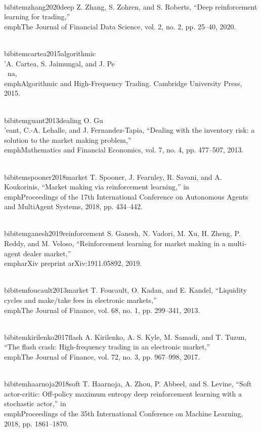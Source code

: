 \documentclass[11pt,a4paper]{article}
\begin{document}
\\bibitem{zhang2020deep}
Z. Zhang, S. Zohren, and S. Roberts, ``Deep reinforcement learning for trading,'' \\emph{The Journal of Financial Data Science}, vol. 2, no. 2, pp. 25--40, 2020.

\\bibitem{cartea2015algorithmic}
{\\'{A}}. Cartea, S. Jaimungal, and J. Pe{\\~{n}}a, \\emph{Algorithmic and High-Frequency Trading}. Cambridge University Press, 2015.

\\bibitem{guant2013dealing}
O. Gu{\\'{e}}ant, C.-A. Lehalle, and J. Fernandez-Tapia, ``Dealing with the inventory risk: a solution to the market making problem,'' \\emph{Mathematics and Financial Economics}, vol. 7, no. 4, pp. 477--507, 2013.

\\bibitem{spooner2018market}
T. Spooner, J. Fearnley, R. Savani, and A. Koukorinis, ``Market making via reinforcement learning,'' in \\emph{Proceedings of the 17th International Conference on Autonomous Agents and MultiAgent Systems}, 2018, pp. 434--442.

\\bibitem{ganesh2019reinforcement}
S. Ganesh, N. Vadori, M. Xu, H. Zheng, P. Reddy, and M. Veloso, ``Reinforcement learning for market making in a multi-agent dealer market,'' \\emph{arXiv preprint arXiv:1911.05892}, 2019.

\\bibitem{foucault2013market}
T. Foucault, O. Kadan, and E. Kandel, ``Liquidity cycles and make/take fees in electronic markets,'' \\emph{The Journal of Finance}, vol. 68, no. 1, pp. 299--341, 2013.

\\bibitem{kirilenko2017flash}
A. Kirilenko, A. S. Kyle, M. Samadi, and T. Tuzun, ``The flash crash: High-frequency trading in an electronic market,'' \\emph{The Journal of Finance}, vol. 72, no. 3, pp. 967--998, 2017.

\\bibitem{haarnoja2018soft}
T. Haarnoja, A. Zhou, P. Abbeel, and S. Levine, ``Soft actor-critic: Off-policy maximum entropy deep reinforcement learning with a stochastic actor,'' in \\emph{Proceedings of the 35th International Conference on Machine Learning}, 2018, pp. 1861--1870.
\end{document}
